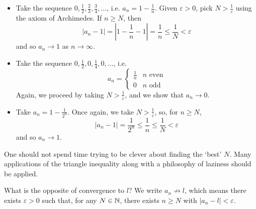 \documentclass{../../template/note}
\begin{document}
    \begin{example}
        \begin{itemize}
            \item Take the sequence \(0, \frac{1}{2}, \frac 2 3, \frac 3 4, \dots\), i.e. \(a_n = 1 - \frac 1 n\). Given \(\varepsilon > 0\), pick \(N > \frac 1 {\varepsilon}\) using the axiom of Archimedes. If \(n \geq N\), then
            \[
                |a_n - 1| = \left|1 - \frac{1}{n} - 1\right| = \frac{1}{n} \leq \frac{1}{N} < \varepsilon
            \]
            and so \(a_n \to 1\) as \(n \to \infty\).
            \item Take the sequence \(0, \frac 1 2, 0, \frac 1 4, 0, \dots\), i.e.
            \[
                a_n = \begin{cases}
                    \frac{1}{n} & n \text{ even} \\
                    0 & n \text{ odd}
                \end{cases}
            \]
            Again, we proceed by taking \(N > \frac{1}{\varepsilon}\), and we show that \(a_n \to 0\).
            \item Take \(a_n = 1 - \frac{1}{2^n}\). Once again, we take \(N > \frac{1}{\varepsilon}\), so, for \(n \geq N\),
            \[
                |a_n - 1| = \frac{1}{2^n} \leq \frac 1 n \leq \frac 1 N < \varepsilon
            \]
            and so \(a_n \to 1\).
        \end{itemize}
        
        
    \end{example}
    
    \begin{remark*}
        One should not spend time trying to be clever about finding the `best' \(N\). Many applications of the triangle inequality along with a philosophy of laziness should be applied.
    \end{remark*}
    
    
    What is the opposite of convergence to \(l\)? We write \(a_n \not \to l\), which means there exists \(\varepsilon > 0\) such that, for any \(N \in \mathbb N\), there exists \(n \geq N\) with \(|a_n - l| < \varepsilon\).
    
\end{document}

